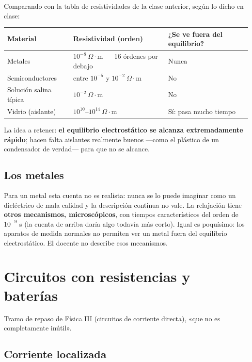 \documentclass[12pt,a4paper]{article}
\begin{document}
Comparando con la tabla de resistividades de la clase anterior, según lo dicho
en clase:

\begin{center}
\renewcommand{\arraystretch}{1.35}
\small
\begin{tabularx}{\textwidth}{l>{\raggedright\arraybackslash}X>{\raggedright\arraybackslash}X}
\toprule
\textbf{Material} & \textbf{Resistividad (orden)} & \textbf{¿Se ve fuera del equilibrio?} \\
\midrule
Metales & $10^{-8}\ \Omega\cdot$m --- 16 órdenes por debajo & Nunca \\
Semiconductores & entre $10^{-5}$ y $10^{-2}\ \Omega\cdot$m & No \\
Solución salina típica & $10^{-2}\ \Omega\cdot$m & No \\
Vidrio (aislante) & $10^{10}$--$10^{14}\ \Omega\cdot$m & Sí: pasa mucho tiempo \\
\bottomrule
\end{tabularx}
\end{center}

La idea a retener: \textbf{el equilibrio electrostático se alcanza extremadamente
rápido}; hacen falta aislantes realmente buenos ---como el plástico de un
condensador de verdad--- para que no se alcance.

\subsection{Los metales}

Para un metal esta cuenta no es realista: nunca se lo puede imaginar como un
dieléctrico de mala calidad y la descripción continua no vale. La relajación
tiene \textbf{otros mecanismos, microscópicos}, con tiempos característicos del
orden de $10^{-9}$ s (la cuenta de arriba daría algo todavía más corto). Igual
es poquísimo: los aparatos de medida normales no permiten ver un metal fuera
del equilibrio electrostático. El docente no describe esos mecanismos.

\section{Circuitos con resistencias y baterías}

Tramo de repaso de Física III (circuitos de corriente directa), «que no es
completamente inútil».

\subsection{Corriente localizada}
\end{document}
